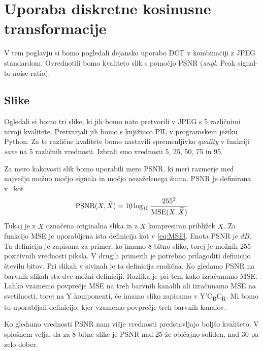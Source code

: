 \documentclass[a4paper,12pt,openright]{book}
\begin{document}


\chapter{Uporaba diskretne kosinusne transformacije}
\label{Uporaba_DCT}
V tem poglavju si bomo pogledali dejansko uporabo DCT v kombinaciji z JPEG standardom. Ovrednotili bomo kvaliteto slik s pomočjo PSNR (\textit{angl.} Peak signal-to-noise ratio).
\section{Slike}
Ogledali si bomo tri slike, ki jih bomo nato pretvorili v JPEG s 5 različnimi nivoji kvalitete. Pretvarjali jih bomo s knjižnico PIL v programskem jeziku Python. Za te različne kvalitete bomo nastavili spremenljivko \textit{quality} v funkciji \textit{save} na 5 različnih vrednosti. Izbrali smo vrednosti 5, 25, 50, 75 in 95.\par
Za mero kakovosti slik bomo uporabili mero PSNR, ki meri razmerje med največjo možno močjo signala in močjo nezaželenega šuma. PSNR je definirana v~\cite{psnr} kot
\begin{equation}
    \hbox{PSNR}(X, \widetilde{X}) = 10\log_{10}\frac{255^2}{\hbox{MSE}(X, \widetilde{X})}
\label{eq:psnr}
\end{equation}
Tukaj je z $X$ označena originalna slika in z $\widetilde{X}$ kompresiran približek $X$. Za funkcijo MSE je uporabljena ista definicija kot v \ref{eq:MSE}. Enota PSNR je $dB$. Ta definicija je zapisana za primer, ko imamo 8-bitno sliko, torej je možnih 255 pozitivnih vrednosti piksla. V drugih primerih je potrebno prilagoditi definicijo številu bitov. Pri slikah v sivinah je ta definicija enolična. Ko gledamo PSNR na barvnih slikah sta dve možni definiciji. Razlika je pri tem kako izračunamo MSE. Lahko vzamemo povprečje MSE na treh barvnih kanalih ali izračunamo MSE na svetilnosti, torej na Y komponenti, če imamo sliko zapisamo v Y'C\textsubscript{B}C\textsubscript{R}. Mi bomo tu uporabljali definicijo, kjer vzamemo povprečje treh barvnih kanalov.\par
Ko gledamo vrednosti PSNR nam višje vrednosti predstavljajo boljšo kvaliteto. V splošnem velja, da za 8-bitne slike je PSNR nad 25 že običajno soliden, nad 30 pa zelo dober.\par
\end{document}
